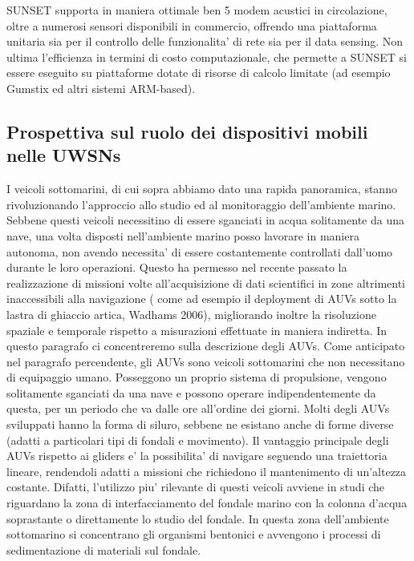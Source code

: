 SUNSET supporta in maniera ottimale ben 5 modem acustici in circolazione, oltre a numerosi sensori disponibili in commercio, offrendo una piattaforma unitaria sia per il controllo delle funzionalita' di rete sia per il data sensing. Non ultima l'efficienza in termini di costo computazionale, che permette a SUNSET si essere eseguito su piattaforme dotate di risorse di calcolo limitate (ad esempio Gumstix ed altri sistemi ARM-based).

\subsection{Prospettiva sul ruolo dei dispositivi mobili nelle UWSNs}
I veicoli sottomarini, di cui sopra abbiamo dato una rapida panoramica, stanno rivoluzionando l'approccio allo studio ed al monitoraggio dell'ambiente marino. \newline Sebbene questi veicoli necessitino di essere sganciati in acqua solitamente da una nave, una volta disposti nell'ambiente marino posso lavorare in maniera autonoma, non avendo necessita' di essere costantemente controllati dall'uomo durante le loro operazioni. \newline Questo ha permesso nel recente passato la realizzazione di missioni volte all'acquisizione di dati scientifici in zone altrimenti inaccessibili alla navigazione ( come ad esempio il deployment di AUVs sotto la lastra di ghiaccio artica, Wadhams 2006), migliorando inoltre la risoluzione spaziale e temporale rispetto a misurazioni effettuate in maniera indiretta.\newline
In questo paragrafo ci concentreremo sulla descrizione degli AUVs.
Come anticipato nel paragrafo percendente, gli AUVs sono veicoli sottomarini che non necessitano di equipaggio umano. Posseggono un proprio sistema di propulsione, vengono solitamente sganciati da una nave e possono operare indipendentemente da questa, per un periodo che va dalle ore all'ordine dei giorni. \newline Molti degli AUVs sviluppati hanno la forma di siluro, sebbene ne esistano anche di forme diverse (adatti a particolari tipi di fondali e movimento).\newline
Il vantaggio principale degli AUVs rispetto ai gliders e' la possibilita' di navigare seguendo una traiettoria lineare, rendendoli adatti a missioni che richiedono il mantenimento di un'altezza costante. \newline
Difatti, l'utilizzo piu' rilevante di questi veicoli  avviene in studi che riguardano la zona di interfacciamento del fondale marino con la colonna d'acqua soprastante o direttamente lo studio del fondale. \newline In questa zona dell'ambiente sottomarino si concentrano gli organismi bentonici e avvengono i processi di sedimentazione di materiali sul fondale. \newline
